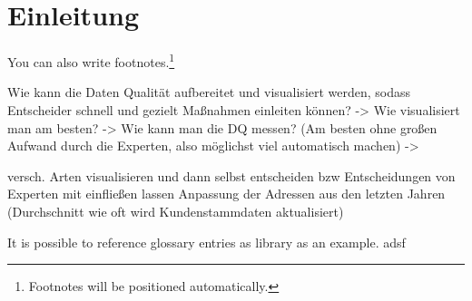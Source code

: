 \chapter{Einleitung}\label{ch:intro}

You can also write footnotes.\footnote{Footnotes will be positioned automatically.}

Wie kann die Daten Qualität aufbereitet und visualisiert werden, sodass Entscheider schnell und gezielt Maßnahmen einleiten können?
-> Wie visualisiert man am besten?
-> Wie kann man die DQ messen? (Am besten ohne großen Aufwand durch die Experten, also möglichst viel automatisch machen)
-> 

versch. Arten visualisieren und dann selbst entscheiden bzw Entscheidungen von Experten mit einfließen lassen
Anpassung der Adressen aus den letzten Jahren (Durchschnitt wie oft wird Kundenstammdaten aktualisiert)


It is possible to reference glossary entries as \gls{library} as an example.
adsf

